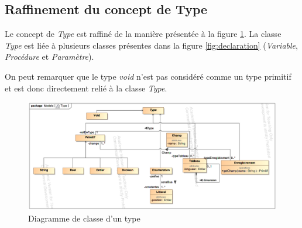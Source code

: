 
\subsection{Raffinement du concept de Type}
\label{sec:question8}

Le concept de \emph{Type} est raffiné de la manière présentée à la figure \ref{fig:type}. La classe \emph{Type} est liée à plusieurs classes présentes dans la figure \ref{fig:declaration} (\emph{Variable}, \emph{Procédure} et \emph{Paramètre}). 

On peut remarquer que le type \emph{void} n'est pas considéré comme un type primitif et est donc directement relié à la classe \emph{Type}. 

\begin{figure}
	\centering
	\includegraphics[width=500pt]{assets/class__Type}
	\caption{Diagramme de classe d'un type}
	\label{fig:type}
\end{figure}
